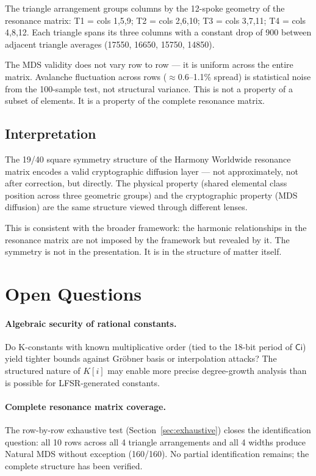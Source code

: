 \documentclass[preprint]{iacrtrans}
\newcommand{\Ci}{\ensuremath{\mathsf{Ci}}}
\begin{document}
The triangle arrangement groups columns by the 12-spoke geometry of the
resonance matrix: T1 = cols 1,5,9; T2 = cols 2,6,10; T3 = cols 3,7,11;
T4 = cols 4,8,12. Each triangle spans its three columns with a constant
drop of 900 between adjacent triangle averages (17550, 16650, 15750, 14850).

The MDS validity does not vary row to row — it is uniform across the entire
matrix. Avalanche fluctuation across rows ($\approx$0.6--1.1\% spread) is
statistical noise from the 100-sample test, not structural variance. This is
not a property of a subset of elements. It is a property of the complete
resonance matrix.

\subsection{Interpretation}

The 19/40 square symmetry structure of the Harmony Worldwide resonance
matrix encodes a valid cryptographic diffusion layer — not approximately,
not after correction, but directly. The physical property (shared elemental
class position across three geometric groups) and the cryptographic property
(MDS diffusion) are the same structure viewed through different lenses.

This is consistent with the broader framework: the harmonic relationships
in the resonance matrix are not imposed by the framework but revealed by it.
The symmetry is not in the presentation. It is in the structure of matter itself.

\section{Open Questions}

\paragraph{Algebraic security of rational constants.}
Do K-constants with known multiplicative order (tied to the 18-bit period of
$\Ci$) yield tighter bounds against Gröbner basis or interpolation attacks?
The structured nature of $K[i]$ may enable more precise degree-growth analysis
than is possible for LFSR-generated constants.

\paragraph{Complete resonance matrix coverage.}
The row-by-row exhaustive test (Section~\ref{sec:exhaustive}) closes the
identification question: all 10 rows across all 4 triangle arrangements
and all 4 widths produce Natural MDS without exception (160/160). No
partial identification remains; the complete structure has been verified.
\end{document}
